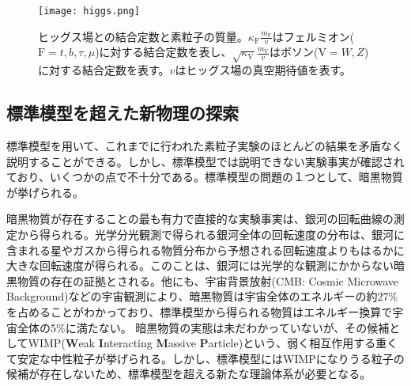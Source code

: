 \begin{figure}[tbp]
  \centering
  \texttt{[image: higgs.png]}
  \caption[ヒッグス場との結合定数と素粒子の質量]{ヒッグス場との結合定数と素粒子の質量\cite{higgs}。$\kappa_\mathrm{F} \frac{m_\mathrm{F}}{v}$はフェルミオン($\mathrm{F}=t, b, \tau, \mu$)に対する結合定数を表し、$\sqrt{\kappa_\mathrm{V}} \frac{m_\mathrm{V}}{v}$はボソン($\mathrm{V}=W, Z$)に対する結合定数を表す。$v$はヒッグス場の真空期待値を表す。 }
  \label{fig:higgs}
\end{figure}

\subsection{標準模型を超えた新物理の探索}
\label{sec:bsm}

標準模型を用いて、これまでに行われた素粒子実験のほとんどの結果を矛盾なく説明することができる。しかし、標準模型では説明できない実験事実が確認されており、いくつかの点で不十分である。標準模型の問題の１つとして、暗黒物質が挙げられる。

暗黒物質が存在することの最も有力で直接的な実験事実は、銀河の回転曲線の測定から得られる。光学分光観測で得られる銀河全体の回転速度の分布は、銀河に含まれる星やガスから得られる物質分布から予想される回転速度よりもはるかに大きな回転速度が得られる。このことは、銀河には光学的な観測にかからない暗黒物質の存在の証拠とされる。他にも、宇宙背景放射(CMB: Cosmic Microwave Background)などの宇宙観測により、暗黒物質は宇宙全体のエネルギーの約$27\%$を占めることがわかっており、標準模型から得られる物質はエネルギー換算で宇宙全体の$5\%$に満たない。
暗黒物質の実態は未だわかっていないが、その候補としてWIMP(\textbf{W}eak \textbf{I}nteracting \textbf{M}assive \textbf{P}article)という、弱く相互作用する重くて安定な中性粒子が挙げられる。しかし、標準模型にはWIMPになりうる粒子の候補が存在しないため、標準模型を超える新たな理論体系が必要となる。


